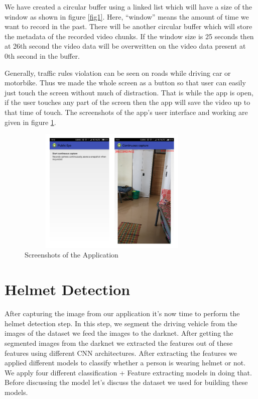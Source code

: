 \par We have created a circular buffer using a linked list which will have a size of the window as shown in figure \ref{fig1}. Here, “window” means the amount of time we want to record in the past. There will be another circular buffer which will store the metadata of the recorded video chunks. If the window size is 25 seconds then at 26th second the video data will be overwritten on the video data present at 0th second in the buffer.

\par Generally, traffic rules violation can be seen on roads while driving car or motorbike. Thus we made the whole screen as a button so that user can easily just touch the screen without much of distraction. That is while the app is open, if the user touches any part of the screen then the app will save the video up to that time of touch. The screenshots of the app’s user interface and working are given in figure \ref{fig2}.

\begin{figure}[!htb]
\centerline{\includegraphics[height=60mm,width=92mm]{img/rd2.png}}
\caption{Screenshots of the Application}
\label{fig2}
\end{figure}


\section{Helmet Detection}
After capturing the image from our application it's now time to perform the helmet detection step. In this step, we segment the driving vehicle from the images of the dataset we feed the images to the darknet\cite{b9}. After getting the segmented images from the darknet\cite{b9} we extracted the features out of these features using different CNN architectures. After extracting the features we applied different models to classify whether a person is wearing helmet or not. We apply four different classification + Feature extracting models in doing that. Before discussing the model let's discuss the dataset we used for building these models.
